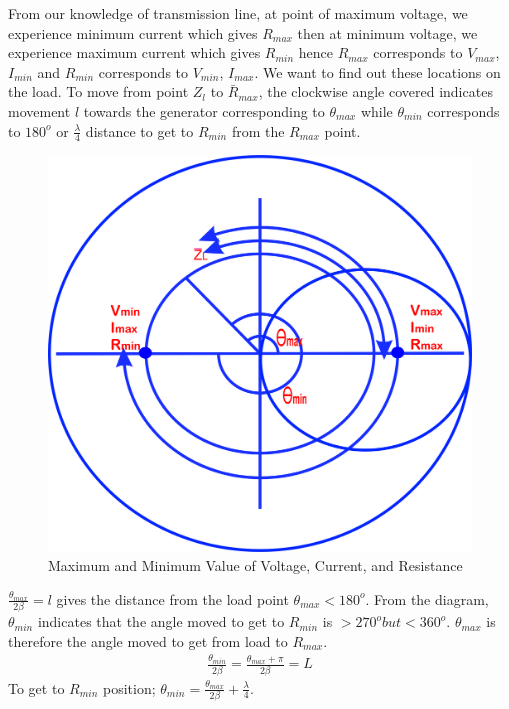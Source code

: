 From our knowledge of transmission line, at point of maximum voltage, we experience minimum current which gives $R_{max}$ then at minimum voltage, we experience maximum current which gives $R_{min}$ hence $R_{max}$ corresponds to $V_{max}$,  $I_{min}$ and  $R_{min}$ corresponds to  $V_{min}$, $I_{max}$.  We want to find out these locations on the load. To move from point $Z_{l}$ to $\bar{R}_{max}$, the clockwise angle covered indicates movement $l$ towards the generator corresponding to $\theta_{max}$ while $\theta_{min}$ corresponds to $180^o$ or $\frac{\lambda}{4}$ distance to get to $R_{min}$ from the $R_{max}$ point.
\begin{figure}[h]
\centering
\includegraphics[width=0.6\linewidth]{./graphics/lkjtresx}
\caption{Maximum and Minimum Value of Voltage, Current, and Resistance}
\label{fig:lkjtresx}
\end{figure}

$\frac{\theta_{max}}{2\beta}=l$ gives the distance from the load point $\theta_{max} < 180^o$. From the diagram, $\theta_{min}$ indicates that the angle moved to get to $R_{min}$ is $>270^o but <360^o$. $\theta_{max}$ is therefore the angle moved to get from load to $R_{max}$.
\begin{align}
\frac{\theta_{min}}{2\beta}=\frac{\theta_{max} + \pi}{2\beta} = L
\end{align}
To get to $R_{min}$ position; $\theta_{min} = \frac{\theta_{max}}{2\beta} + \frac{\lambda}{4}.$ 